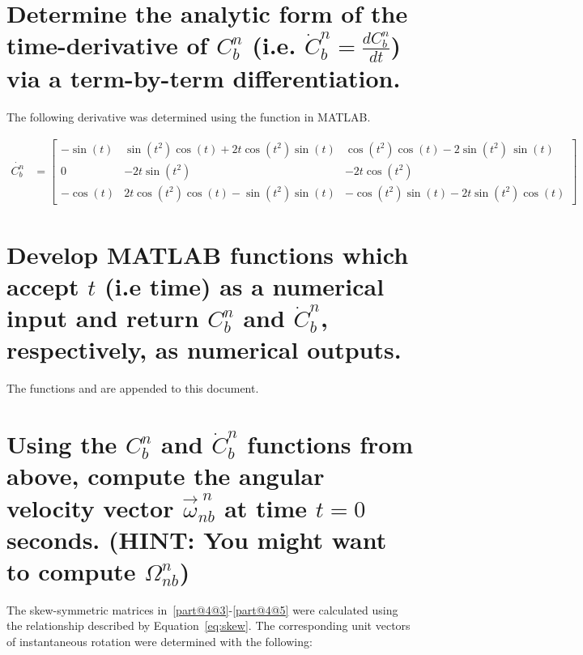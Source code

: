 \begin{parts}

    \part{Determine the analytic form of the time-derivative of $C^n_b$ (i.e. $\dot{C}^n_b = \frac{dC^n_b}{dt}$) via a term-by-term differentiation.}

    \solution
    The following derivative was determined using the  function in MATLAB.

    \begin{equation*}
        \begin{split}
            \dot{C_b^n} & =
            \begin{bmatrix}
                -\sin(t) & \sin(t^2)\cos(t)+2t\cos(t^2)\sin(t) & \cos(t^2)\cos(t)-2\sin(t^2)\,\sin(t) \\
                0        & -2t\sin(t^2)                        & -2t\cos(t^2)                         \\
                -\cos(t) & 2t\cos(t^2)\cos(t)-\sin(t^2)\sin(t) & -\cos(t^2)\sin(t)-2t\sin(t^2)\cos(t)
            \end{bmatrix}
        \end{split}
    \end{equation*}

    \part{Develop MATLAB functions which accept $t$ (i.e time) as a numerical input and return $C^n_b$ and $\dot{C}^n_b$, respectively, as numerical outputs.}

    \solution
    The functions  and  are appended to this document.

    \part{Using the $C^n_b$ and $\dot{C}^n_b$ functions from above, compute the angular velocity vector $\vec{\omega}^{\;n}_{nb}$ at time $t = 0$ seconds. (HINT: You might want to compute $\Omega^{n}_{nb}$)}

    \solution
    The skew-symmetric matrices in~\ref{part@4@3}-\ref{part@4@5} were calculated using the relationship described by Equation~\ref{eq:skew}. The corresponding unit vectors of instantaneous rotation were determined with the following:


\end{parts}
